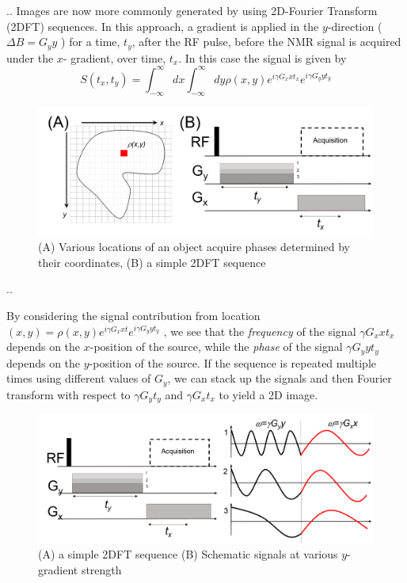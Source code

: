 \documentclass[handout]{beamer}
\begin{document}
\begin{frame}{\thesection.\thesubsection. \insertsubsection}
  Images are now more commonly generated by using
  2D-Fourier Transform (2DFT) sequences. In this approach, a gradient is applied
  in the $y$-direction ($\Delta B = G_y y$ ) for a time, $t_y$, after the RF
  pulse, before the NMR signal is acquired under the $x$-
  gradient, over time, $t_x$. In this case the signal is given by
  \begin{equation} \label{eq: simple_mri1}
    S(t_x,t_y) = \int_{- \infty}^{\infty} dx \int_{- \infty}^{\infty} dy
 \rho(x,y) e^{i \gamma G_x x t_x } e^{i \gamma G_y y t_y} 
  \end{equation}
  
  \begin{figure}
	\centering
    \includegraphics[scale=0.3]{figures/simple_2D_mri3.png}
    \caption{(A) Various locations of an object acquire phases determined by their coordinates, (B) a simple 2DFT sequence}
  \end{figure}
\end{frame}


\begin{frame}{\thesection.\thesubsection. \insertsubsection}
  
  By considering the signal contribution from location
  $(x,y)= \rho(x,y) e^{i \gamma G_x x t} e^{i \gamma G_y y t_y}$  , we see that the \textit{frequency} of  the signal $\gamma G_x x t_x$  depends on the $x$-position of the   source, while the \textit{phase} of the signal $\gamma G_y y t_y$ depends
  on the $y$-position of the source. If the sequence is repeated multiple times using different values of $G_y$, we  can stack up the signals  and then Fourier transform with  respect to $\gamma G_y t_y$ and $\gamma G_x t_x$ to yield a 2D image. \\
  
   \begin{figure}
  	\centering
  	\includegraphics[scale=0.3]{figures/simple_2D_mri4.png}
  	\caption{(A) a simple 2DFT sequence (B) Schematic signals at various $y$-gradient strength}
  \end{figure}
  
\end{frame}
\end{document}
